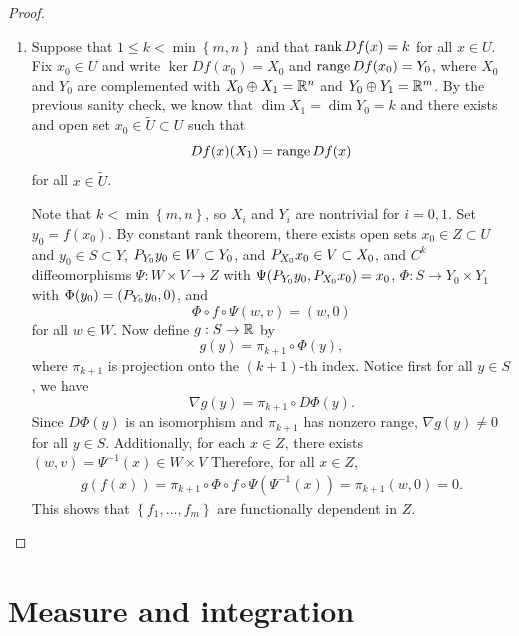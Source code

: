 \documentclass[a4paper]{article}
\begin{document}
\begin{proof}
{\begin{enumerate}
      \item Suppose that $1 \leq k < \min \left\{ m, n \right\}$ and that
            $\operatorname{rank} Df(x) = k$ for all $x \in U$. Fix $x_0 \in U$ and write
            $\ker Df(x_0) = X_0$ and $\operatorname{range} Df(x_0) = Y_0$, where $X_0$ and
            $Y_0$ are complemented with $X_0 \oplus X_1 = \mathbb{R}^n$ and $Y_0
            \oplus Y_1 = \mathbb{R}^m$. By the previous sanity check, we know that
            $\dim X_1 = \dim Y_0 = k$ and there exists and open set $x_0
            \in \tilde{U} \subset U$ such that
            \[
              Df(x)(X_1) = \operatorname{range} Df(x)
            \]
            for all $x \in \tilde{U}$.

            Note that $k < \min \left\{ m, n \right\}$, so $X_i$ and $Y_i$
            are nontrivial for $i = 0, 1$. Set $y_0 = f(x_0)$. By constant
            rank theorem, there exists open sets $x_0 \in Z \subset U$ and
            $y_0 \in S \subset Y$, ${P_{Y_0}} y_0 \in W \subset Y_0$, and ${P_{X_0}}
            x_0 \in V \subset X_0$, and $C^k$ diffeomorphisms $\Psi: W
            \times V \to Z$ with $\Psi({P_{Y_0}} y_0, {P_{X_0}} x_0) = x_0$, $\Phi: S
            \to Y_0 \times Y_1$ with $\Phi(y_0) = ({P_{Y_0}} y_0, 0)$, and
            \[
              \Phi \circ f \circ \Psi(w, v) = (w, 0)
            \]
            for all $w \in W$. Now define $g: S \to \mathbb{R}$ by
            \[
              g(y) = \pi_{k+1} \circ \Phi(y),
            \]
            where $\pi_{k+1}$ is projection onto the $(k+1)$-th index.
            Notice first for all $y \in S$, we have
            \[
              \nabla g(y) = \pi_{k+1} \circ D\Phi(y).
            \]
            Since $D\Phi(y)$ is an isomorphism and $\pi_{k+1}$ has nonzero
            range, $\nabla g(y) \neq 0$ for all $y \in S$. Additionally,
            for each $x \in Z$, there exists $(w, v) = \Psi^{-1}(x) \in W
            \times V$ Therefore, for all $x \in Z$,
            \[
              \begin{aligned}
                g(f(x)) = \pi_{k+1} \circ \Phi \circ f \circ \Psi(\Psi^{-1}(x))
                = \pi_{k+1} (w, 0) = 0.
              \end{aligned}
            \]
            This shows that $\left\{ f_1, \dots, f_m \right\}$ are
            functionally dependent in $Z$.
    \end{enumerate}

  }
\end{proof}

\section{Measure and integration}
\end{document}
